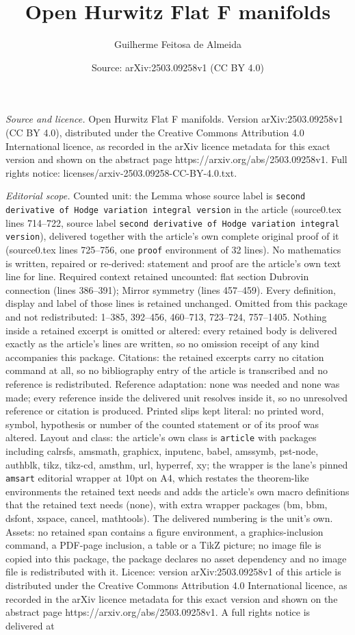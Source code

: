 \documentclass[10pt,a4paper]{amsart}
\title[Open Hurwitz Flat F manifolds]{Open Hurwitz Flat F manifolds}
\author{Guilherme Feitosa de Almeida}
\date{Source: arXiv:2503.09258v1 (CC BY 4.0)}
\begin{document}
\maketitle

\noindent\emph{Source and licence.} Open Hurwitz Flat F manifolds. Version arXiv:2503.09258v1 (CC BY 4.0), distributed under the Creative Commons Attribution 4.0 International licence, as recorded in the arXiv licence metadata for this exact version and shown on the abstract page https://arxiv.org/abs/2503.09258v1. Full rights notice: licenses/arxiv-2503.09258-CC-BY-4.0.txt.\par\smallskip

\noindent\textit{Editorial scope.} Counted unit: the Lemma whose source label is \texttt{second derivative of Hodge variation integral version} in the article (source0.tex lines 714--722, source label \texttt{second derivative of Hodge variation integral version}), delivered together with the article's own complete original proof of it (source0.tex lines 725--756, one \texttt{proof} environment of 32 lines). No mathematics is written, repaired or re-derived: statement and proof are the article's own text line for line. Required context retained uncounted: flat section Dubrovin connection (lines 386--391); Mirror symmetry (lines 457--459). Every definition, display and label of those lines is retained unchanged. Omitted from this package and not redistributed: 1--385, 392--456, 460--713, 723--724, 757--1405. Nothing inside a retained excerpt is omitted or altered: every retained body is delivered exactly as the article's lines are written, so no omission receipt of any kind accompanies this package. Citations: the retained excerpts carry no citation command at all, so no bibliography entry of the article is transcribed and no reference is redistributed. Reference adaptation: none was needed and none was made; every reference inside the delivered unit resolves inside it, so no unresolved reference or citation is produced. Printed slips kept literal: no printed word, symbol, hypothesis or number of the counted statement or of its proof was altered. Layout and class: the article's own class is \texttt{article} with packages including calrsfs, amsmath, graphicx, inputenc, babel, amssymb, pst-node, authblk, tikz, tikz-cd, amsthm, url, hyperref, xy; the wrapper is the lane's pinned \texttt{amsart} editorial wrapper at 10pt on A4, which restates the theorem-like environments the retained text needs and adds the article's own macro definitions that the retained text needs (none), with extra wrapper packages (bm, bbm, dsfont, xspace, cancel, mathtools). The delivered numbering is the unit's own. Assets: no retained span contains a figure environment, a graphics-inclusion command, a PDF-page inclusion, a table or a TikZ picture; no image file is copied into this package, the package declares no asset dependency and no image file is redistributed with it. Licence: version arXiv:2503.09258v1 of this article is distributed under the Creative Commons Attribution 4.0 International licence, as recorded in the arXiv licence metadata for this exact version and shown on the abstract page https://arxiv.org/abs/2503.09258v1. A full rights notice is delivered at 
\end{document}
